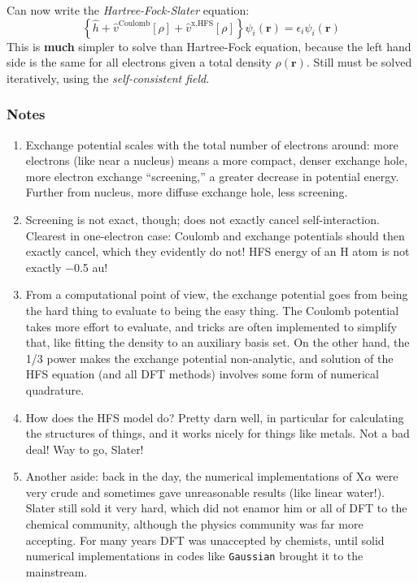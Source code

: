 \documentclass[11pt]{article}
\begin{document}
Can now write the \emph{Hartree-Fock-Slater} equation:
\[ \left\{ \hat{h} + \hat{v}^\text{Coulomb}[\rho] + \hat{v}^\text{x,HFS}[\rho]\right \} \psi_i(\mathbf{r}) = \epsilon_i\psi_i(\mathbf{r}) \]
This is \textbf{much} simpler to solve than Hartree-Fock equation, because the left hand side is the same for all electrons given a total density \(\rho(\mathbf{r})\). Still must be solved iteratively, using the \emph{self-consistent field}.

\subsubsection{Notes}
\label{sec:org95c0242}
\begin{enumerate}
\item Exchange potential scales with the total number of electrons around: more electrons (like near a nucleus) means a more compact, denser exchange hole, more electron exchange ``screening,'' a greater decrease in potential energy.  Further from nucleus, more diffuse exchange hole, less screening.

\item Screening is not exact, though; does not exactly cancel self-interaction.  Clearest in one-electron case: Coulomb and exchange potentials should then exactly cancel, which they evidently do not!  HFS energy of an H atom is not exactly −0.5 au!

\item From a computational point of view, the exchange potential goes from being the hard thing to evaluate to being the easy thing.  The Coulomb potential takes more effort to evaluate, and tricks are often implemented to simplify that, like fitting the density to an auxiliary basis set.  On the other hand, the 1/3 power makes the exchange potential non-analytic, and solution of the HFS equation (and all DFT methods) involves some form of numerical quadrature.

\item How does the HFS model do?  Pretty darn well, in particular for calculating the structures of things, and it works nicely for things like metals.  Not a bad deal!  Way to go, Slater!

\item Another aside: back in the day, the numerical implementations of X\(\alpha\) were very crude and sometimes gave unreasonable results (like linear water!).  Slater still sold it very hard, which did not enamor him or all of DFT to the chemical community, although the physics community was far more accepting.  For many years DFT was unaccepted by chemists, until solid numerical implementations in codes like \texttt{Gaussian} brought it to the mainstream.
\end{enumerate}
\end{document}
